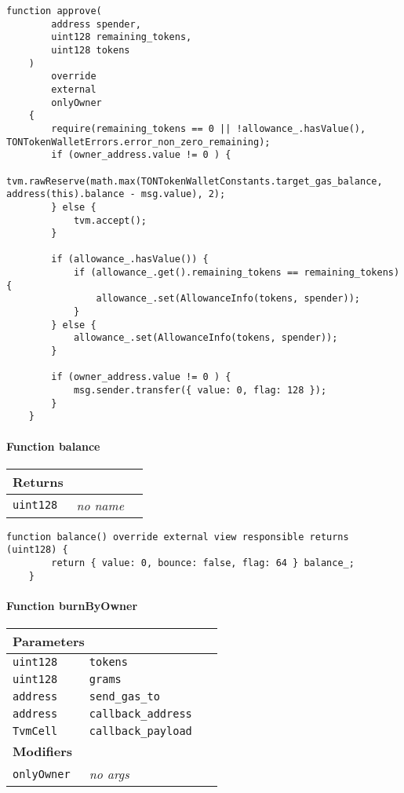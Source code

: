 \begin{lstlisting}[firstnumber=119]
    function approve(
        address spender,
        uint128 remaining_tokens,
        uint128 tokens
    )
        override
        external
        onlyOwner
    {
        require(remaining_tokens == 0 || !allowance_.hasValue(), TONTokenWalletErrors.error_non_zero_remaining);
        if (owner_address.value != 0 ) {
            tvm.rawReserve(math.max(TONTokenWalletConstants.target_gas_balance, address(this).balance - msg.value), 2);
        } else {
            tvm.accept();
        }

        if (allowance_.hasValue()) {
            if (allowance_.get().remaining_tokens == remaining_tokens) {
                allowance_.set(AllowanceInfo(tokens, spender));
            }
        } else {
            allowance_.set(AllowanceInfo(tokens, spender));
        }

        if (owner_address.value != 0 ) {
            msg.sender.transfer({ value: 0, flag: 128 });
        }
    }
\end{lstlisting}

\paragraph{Function balance}


\ifsoltables
\noindent\begin{tabular}{|l|l|p{5cm}|}\hline
\multicolumn{3}{|l|}{\bf Returns}\\\hline
\tt uint128 & {\em no name} &\\\hline
\end{tabular}
\fi

\vspace{2cm}

\begin{lstlisting}[firstnumber=58]
    function balance() override external view responsible returns (uint128) {
        return { value: 0, bounce: false, flag: 64 } balance_;
    }
\end{lstlisting}

\paragraph{Function burnByOwner}


\ifsoltables
\noindent\begin{tabular}{|l|l|p{5cm}|}\hline
\multicolumn{3}{|l|}{\bf Parameters}\\\hline
\tt uint128 & \tt tokens &\\\hline
\tt uint128 & \tt grams &\\\hline
\tt address & \tt send\_{}gas\_{}to &\\\hline
\tt address & \tt callback\_{}address &\\\hline
\tt TvmCell & \tt callback\_{}payload &\\\hline
\multicolumn{3}{|l|}{\bf Modifiers}\\\hline
\tt onlyOwner & {\em no args} &\\\hline
\end{tabular}
\fi

